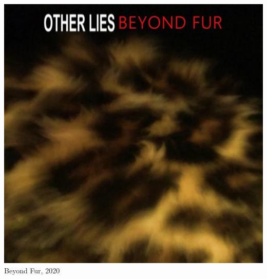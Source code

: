 \begin{titlepage}
  \maketitle
  \thispagestyle{empty}
  \setcounter{page}{0}

  \vspace{2em}

 \begin{center}
  \begin{minipage}[t]{.33\textwidth}
    \centering
    \includegraphics[width=0.98\linewidth]{1-Beyond-Fur/beyond-fur.jpg}\\
    {\Large \sffamily Beyond Fur, 2020}
  \end{minipage}%
  \begin{minipage}[t]{0.33\textwidth}
    \centering

\end{minipage}
\end{center}
\end{titlepage}
